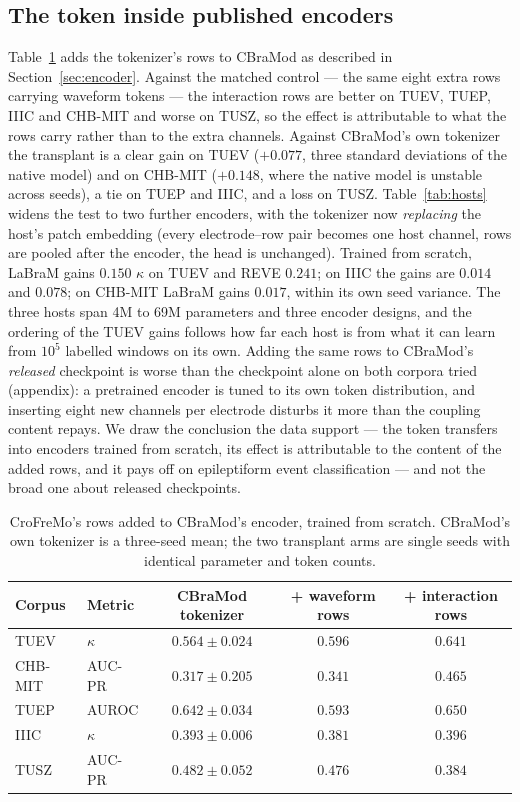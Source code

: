 \subsection{The token inside published encoders}
\label{sec:transplant}

Table~\ref{tab:transplant} adds the tokenizer's rows to CBraMod as
described in Section~\ref{sec:encoder}. Against the matched control ---
the same eight extra rows carrying waveform tokens --- the interaction
rows are better on TUEV, TUEP, IIIC and CHB-MIT and worse on TUSZ, so
the effect is attributable to what the rows carry rather than to the
extra channels. Against CBraMod's own tokenizer the transplant is a clear
gain on TUEV ($+0.077$, three standard deviations of the native model) and
on CHB-MIT ($+0.148$, where the native model is unstable across seeds), a
tie on TUEP and IIIC, and a loss on TUSZ.
Table~\ref{tab:hosts} widens the test to two further encoders, with
the tokenizer now \emph{replacing} the host's patch embedding (every
electrode--row pair becomes one host channel, rows are pooled after the
encoder, the head is unchanged). Trained from scratch, LaBraM gains
$0.150$ $\kappa$ on TUEV and REVE $0.241$; on IIIC the gains are
$0.014$ and $0.078$; on CHB-MIT LaBraM gains $0.017$, within its own
seed variance. The three hosts span 4M to 69M parameters and three
encoder designs, and the ordering of the TUEV gains follows how far each
host is from what it can learn from $10^5$ labelled windows on its own.
Adding the same rows to CBraMod's \emph{released} checkpoint is worse
than the checkpoint alone on both corpora tried (appendix): a pretrained
encoder is tuned to its own token distribution, and inserting eight new
channels per electrode disturbs it more than the coupling content
repays. We draw the conclusion the data support --- the token transfers
into encoders trained from scratch, its effect is attributable to the
content of the added rows, and it pays off on epileptiform event
classification --- and not the broad one about released checkpoints.

\begin{table}[t]
\centering
\small
\caption{CroFreMo's rows added to CBraMod's encoder, trained from scratch.
CBraMod's own tokenizer is a three-seed mean; the two transplant arms are
single seeds with identical parameter and token counts.}
\label{tab:transplant}
\begin{tabular}{llccc}
\toprule
Corpus & Metric & CBraMod tokenizer & + waveform rows & + interaction rows \\
\midrule
TUEV & $\kappa$ & $0.564 \pm 0.024$ & $0.596$ & $\mathbf{0.641}$ \\
CHB-MIT & AUC-PR & $0.317 \pm 0.205$ & $0.341$ & $\mathbf{0.465}$ \\
TUEP & AUROC & $0.642 \pm 0.034$ & $0.593$ & $\mathbf{0.650}$ \\
IIIC & $\kappa$ & $0.393 \pm 0.006$ & $0.381$ & $0.396$ \\
TUSZ & AUC-PR & $\mathbf{0.482 \pm 0.052}$ & $0.476$ & $0.384$ \\
\bottomrule
\end{tabular}
\end{table}

